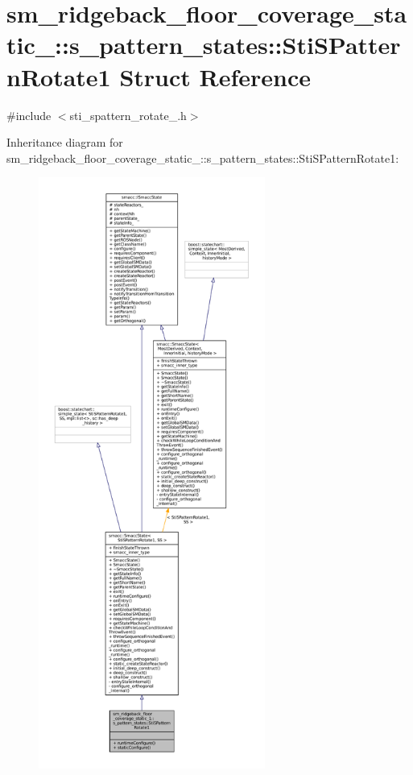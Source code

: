 \hypertarget{structsm__ridgeback__floor__coverage__static__1_1_1s__pattern__states_1_1StiSPatternRotate1}{}\section{sm\+\_\+ridgeback\+\_\+floor\+\_\+coverage\+\_\+static\+\_\+:\+:s\+\_\+pattern\+\_\+states\+:\+:Sti\+S\+Pattern\+Rotate1 Struct Reference}
\label{structsm__ridgeback__floor__coverage__static__1_1_1s__pattern__states_1_1StiSPatternRotate1}


{\ttfamily \#include $<$sti\+\_\+spattern\+\_\+rotate\+\_.\+h$>$}



Inheritance diagram for sm\+\_\+ridgeback\+\_\+floor\+\_\+coverage\+\_\+static\+\_\+:\+:s\+\_\+pattern\+\_\+states\+:\+:Sti\+S\+Pattern\+Rotate1\+:
\nopagebreak
\begin{figure}[H]
\begin{center}
\leavevmode
\includegraphics[height=550pt]{structsm__ridgeback__floor__coverage__static__1_1_1s__pattern__states_1_1StiSPatternRotate1__inherit__graph}
\end{center}
\end{figure}


